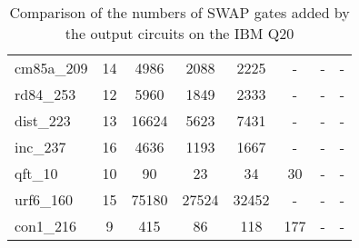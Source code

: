 \documentclass[journal]{IEEEtran}
\begin{document}
\begin{table*}[htbp]
\begin{center}
\begin{tabular}{|p{4.3cm}<{\centering}|c|c|c|c|c|c|c|}
cm85a\_209 & 14 & 4986 & 2088 & 2225 & - & -& - \\
rd84\_253 & 12 & 5960 & 1849 & 2333 & - & -& - \\
dist\_223 & 13 & 16624 & 5623 & 7431 & - & -& - \\
inc\_237 & 16 & 4636 & 1193 & 1667 & - & -& - \\
qft\_10 & 10 & 90 & 23 & 34 & 30 & -& - \\
urf6\_160 & 15 & 75180 & 27524 & 32452 & - & -& - \\
con1\_216 & 9 & 415 & 86 & 118 & 177 & -& - \\
            \hline
            \end{tabular} 
            \end{center}	
            \caption{Comparison of  the numbers of SWAP gates added by the 
            output circuits on the IBM Q20 }
            \label{tab4}  
            \end{table*}
              
\end{document}
